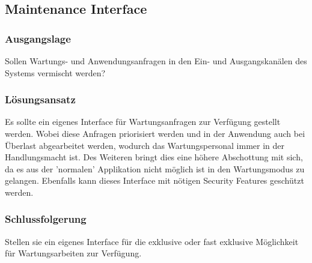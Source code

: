 
\subsection{Maintenance Interface}

\subsubsection*{Ausgangslage}

Sollen Wartungs- und Anwendungsanfragen in den Ein- und Ausgangskanälen des Systems vermischt werden?

\subsubsection*{Lösungsansatz}

Es sollte ein eigenes Interface für Wartungsanfragen zur Verfügung gestellt werden. Wobei diese Anfragen priorisiert werden und in der Anwendung auch bei Überlast abgearbeitet werden, wodurch das Wartungspersonal immer in der Handlungsmacht ist. Des Weiteren bringt dies eine höhere Abschottung mit sich, da es aus der 'normalen' Applikation nicht möglich ist in den Wartungsmodus zu gelangen. Ebenfalls kann dieses Interface mit nötigen Security Features geschützt werden.

\subsubsection*{Schlussfolgerung}

Stellen sie ein eigenes Interface für die exklusive oder fast exklusive Möglichkeit für Wartungsarbeiten zur Verfügung.

